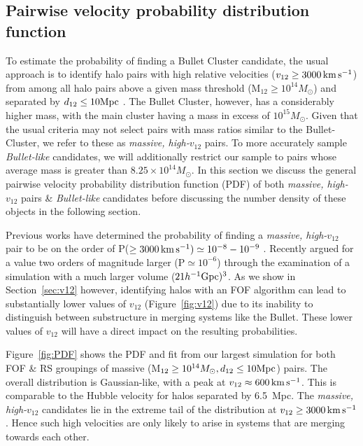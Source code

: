 \documentclass[useAMS, usenatbib]{mn2e}
\newcommand{\Msun}{M_{\odot}}
\newcommand{\hinv}{h^{-1}}
\newcommand{\vonetwo}{v_{12}}
\newcommand{\kms}{\,\rm{km}\,\rm{s}^{-1}}
\begin{document}
\subsection{Pairwise velocity probability distribution function}
 \label{sec:pdf}
To estimate the probability of finding a Bullet Cluster candidate,
the usual approach is to identify halo pairs with high relative velocities ($\vonetwo\geq3000\kms$)
from among all halo pairs above a given mass threshold (M$_{12}\geq10^{14}\Msun$) and separated by $d_{12}\leq10\rm{Mpc}$ .
The Bullet Cluster, however, has a considerably higher mass, with the main cluster having a mass in excess of $10^{15}\Msun$.  
Given that the usual criteria may not select pairs with mass ratios similar to the Bullet-Cluster, we refer to these as {\it massive, high-$\vonetwo$} pairs.
To more accurately sample {\it Bullet-like} candidates, we will additionally restrict our sample to pairs whose average mass is greater than $8.25\times10^{14}\Msun$.
In this section we discuss the general pairwise velocity probability distribution function (PDF) of both {\it massive, high-$\vonetwo$} pairs \& {\it Bullet-like} candidates before discussing the number density of these objects in the following section.

Previous works have determined
the probability of finding a {\it massive, high-$\vonetwo$} pair to be on the order of P($\geq3000\kms)\simeq10^{-8}-10^{-9}$
\citep{Lee10,Thompson12}.  Recently \citet{Bouillot14} argued for
a value two orders of magnitude larger (P$\simeq10^{-6}$) through
the examination of a simulation with a much larger volume ($21\hinv
\rm{Gpc})^{3}$.  As we show in Section~\ref{sec:v12} however,
identifying halos with an FOF algorithm can lead to substantially
lower values of $\vonetwo$ (Figure~\ref{fig:v12}) due to its inability
to distinguish between substructure in merging systems like the
Bullet.  These lower values of $\vonetwo$ will have a direct impact
on the resulting probabilities.

Figure~\ref{fig:PDF} shows the PDF and fit from our largest simulation
for both FOF \& RS groupings of massive (M$_{12}\geq10^{14}\Msun,d_{12}\leq10\rm{Mpc}$) pairs.  The overall distribution is
Gaussian-like, with a peak at $\vonetwo\approx 600\kms$.  This is
comparable to the Hubble velocity for halos separated by 6.5~Mpc.
The {\it massive, high-$\vonetwo$} candidates lie in the extreme tail of the distribution
at $\vonetwo\geq 3000\kms$.  Hence such high velocities are only
likely to arise in systems that are merging towards each other.
\end{document}
